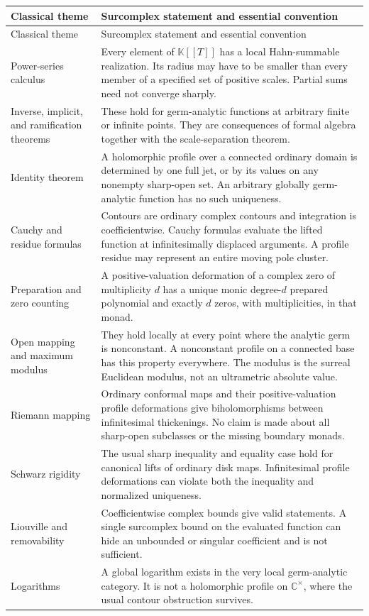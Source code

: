 \documentclass[11pt,a4paper]{article}
\numberwithin{equation}{section}
\theoremstyle{definition}
\newcommand{\K}{\mathbb K}
\newcommand{\C}{\mathbb C}
\begin{document}
\renewcommand{\arraystretch}{1.18}
\begin{longtable}{@{}>{\raggedright\arraybackslash}p{}p{}@{}}
\toprule
Classical theme & Surcomplex statement and essential convention\\
\midrule
\endfirsthead
\toprule
Classical theme & Surcomplex statement and essential convention\\
\midrule
\endhead
Power-series calculus & Every element of $\K[[T]]$ has a local Hahn-summable
realization. Its radius may have to be smaller than every member of a
specified set of positive scales. Partial sums need not converge sharply.\\
Inverse, implicit, and ramification theorems & These hold for germ-analytic
functions at arbitrary finite or infinite points. They are consequences of
formal algebra together with the scale-separation theorem.\\
Identity theorem & A holomorphic profile over a connected ordinary domain is
determined by one full jet, or by its values on any nonempty sharp-open set.
An arbitrary globally germ-analytic function has no such uniqueness.\\
Cauchy and residue formulas & Contours are ordinary complex contours and
integration is coefficientwise. Cauchy formulas evaluate the lifted function
at infinitesimally displaced arguments. A profile residue may represent an
entire moving pole cluster.\\
Preparation and zero counting & A positive-valuation deformation of a complex
zero of multiplicity $d$ has a unique monic degree-$d$ prepared polynomial
and exactly $d$ zeros, with multiplicities, in that monad.\\
Open mapping and maximum modulus & They hold locally at every point where the
analytic germ is nonconstant. A nonconstant profile on a connected base has
this property everywhere. The modulus is the surreal Euclidean modulus,
not an ultrametric absolute value.\\
Riemann mapping & Ordinary conformal maps and their positive-valuation profile
deformations give biholomorphisms between infinitesimal thickenings. No claim
is made about all sharp-open subclasses or the missing boundary monads.\\
Schwarz rigidity & The usual sharp inequality and equality case hold for
canonical lifts of ordinary disk maps. Infinitesimal profile deformations can
violate both the inequality and normalized uniqueness.\\
Liouville and removability & Coefficientwise complex bounds give valid
statements. A single surcomplex bound on the evaluated function can hide an
unbounded or singular coefficient and is not sufficient.\\
Logarithms & A global logarithm exists in the very local germ-analytic
category. It is not a holomorphic profile on $\C^\times$, where the usual
contour obstruction survives.\\
\bottomrule
\end{longtable}
\renewcommand{\arraystretch}{1}
\end{document}

